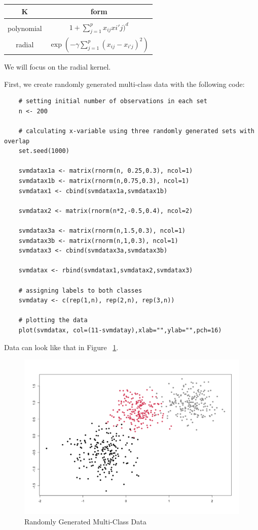 \documentclass[12pt]{article}
\begin{document}
\begin{centering}
    \begin{tabular}{c | c}
        K & form \\
        \hline \\
        polynomial & \(1+ \sum_{j=1}^p x_{ij}x{i'j})^d \) \\
        radial & \(\exp ( - \gamma \sum_{j=1}^p (x_{ij}-x_{i'j})^2) \)
    \end{tabular}
\end{centering}

We will focus on the radial kernel. 

First, we create randomly generated multi-class data with the following code:

\begin{verbatim}
    # setting initial number of observations in each set
    n <- 200

    # calculating x-variable using three randomly generated sets with overlap
    set.seed(1000)

    svmdatax1a <- matrix(rnorm(n, 0.25,0.3), ncol=1)
    svmdatax1b <- matrix(rnorm(n,0.75,0.3), ncol=1)
    svmdatax1 <- cbind(svmdatax1a,svmdatax1b)

    svmdatax2 <- matrix(rnorm(n*2,-0.5,0.4), ncol=2)

    svmdatax3a <- matrix(rnorm(n,1.5,0.3), ncol=1)
    svmdatax3b <- matrix(rnorm(n,1,0.3), ncol=1)
    svmdatax3 <- cbind(svmdatax3a,svmdatax3b)

    svmdatax <- rbind(svmdatax1,svmdatax2,svmdatax3)

    # assigning labels to both classes
    svmdatay <- c(rep(1,n), rep(2,n), rep(3,n))

    # plotting the data
    plot(svmdatax, col=(11-svmdatay),xlab="",ylab="",pch=16)
\end{verbatim}

Data can look like that in Figure ~\ref{fig_svm_randomly_generated_data}.

\begin{figure}[ht]
    \centering
    \includegraphics[width=5in]{Figures/svm_randomly_generated_data.png}
    \caption{Randomly Generated Multi-Class Data}
    \label{fig_svm_randomly_generated_data}
\end{figure}
\end{document}
